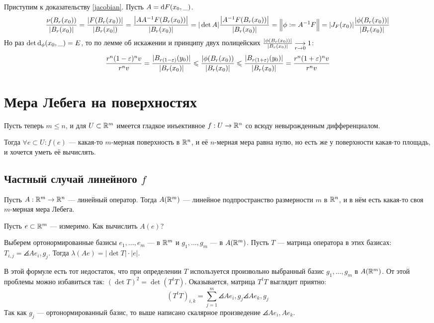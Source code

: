 \documentclass[a4paper]{report}
\begin{document}
    Приступим к доказательству \eqref{jacobian}.
    Пусть $A = \operatorname{d}\! F(x_0, \_)$.
    \[\frac{\nu(B_r(x_0))}{|B_r(x_0)|} = \frac{|F(B_r(x_0))|}{|B_r(x_0|)} = \frac{\left|AA^{-1}F(B_r(x_0))\right|}{\left|B_r(x_0)\right|} = |\det A|\frac{\left|A^{-1}F(B_r(x_0))\right|}{|B_r(x_0)|} =\Big\|\phi \coloneqq A^{-1}F\Big\|= |J_F(x_0)|\frac{|\phi(B_r(x_0))|}{|B_r(x_0)|}\]
    Но раз $\det \operatorname{d}\!_\phi(x_0, \_) =E$, то по лемме об искажении и принципу двух полицейских ${\frac{|\phi(B_r(x_0))|}{|B_r(x_0)|} \underset{r \to 0}{\longrightarrow} 1}$:
    \[\frac{r^n (1 - \varepsilon)^n v}{r^n v} = \frac{|B_{r(1 - \varepsilon)}(y_0)|}{|B_r(x_0)|} \leqslant \frac{|\phi(B_r(x_0))}{|B_r(x_0)|}\leqslant \frac{|B_{r(1 + \varepsilon)}(y_0)|}{|B_r(x_0)|} = \frac{r^n(1 + \varepsilon)^n v}{r^n v}\]


    \section{Мера Лебега на поверхностях}
    Пусть теперь $m \le n$, и для $U \subset \mathbb{R}^m$ имеется гладкое инъективное $f: U \rightarrow \mathbb{R}^n$ со всюду невырожденным дифференциалом.

    Тогда $\forall e \subset U: f(e)$ --- какая-то $m$-мерная поверхность в $\mathbb{R}^n$, и её $n$-мерная мера равна нулю, но есть же у поверхности какая-то площадь, и хочется уметь её вычислять.

    \subsection{Частный случай линейного $f$}
    Пусть $A: \mathbb{R}^m \rightarrow \mathbb{R}^n$ --- линейный оператор.
    Тогда $A(\mathbb{R}^m)$ --- линейное подпространство размерности $m$ в $\mathbb{R}^n$, и в нём есть какая-то своя $m$-мерная мера Лебега.

    Пусть $e \subset \mathbb{R}^m$ --- измеримо.
    Как вычислить $A(e)$?

    Выберем ортонормированные базисы $e_1, \dots, e_m$ --- в $\mathbb{R}^m$ и $g_1, \dots, g_m$ --- в $A(\mathbb{R}^m)$.
    Пусть $T$ --- матрица оператора в этих базисах: $T_{i,j} = \angles{A e_i, g_j}$.
    Тогда $\lambda(Ae) = |\det T|\cdot|e|$.

    В этой формуле есть тот недостаток, что при определении $T$ используется произвольно выбранный базис $g_1, \dots, g_m$ в $A(\mathbb{R}^m)$.
    От этой проблемы можно избавиться так: $(\det T)^2 = \det(T^t T)$.
    Оказывается, матрица $T^t T$ выглядит приятно:
    \[\left(T^t T\right)_{i,k} = \sum\limits_{j = 1}^{m}\angles{A e_i, g_j}\angles{A e_k, g_j}\]
    Так как $g_{j}$ --- ортонормированный базис, то выше написано скалярное произведение $\angles{Ae_i, A e_k}$.
\end{document}
